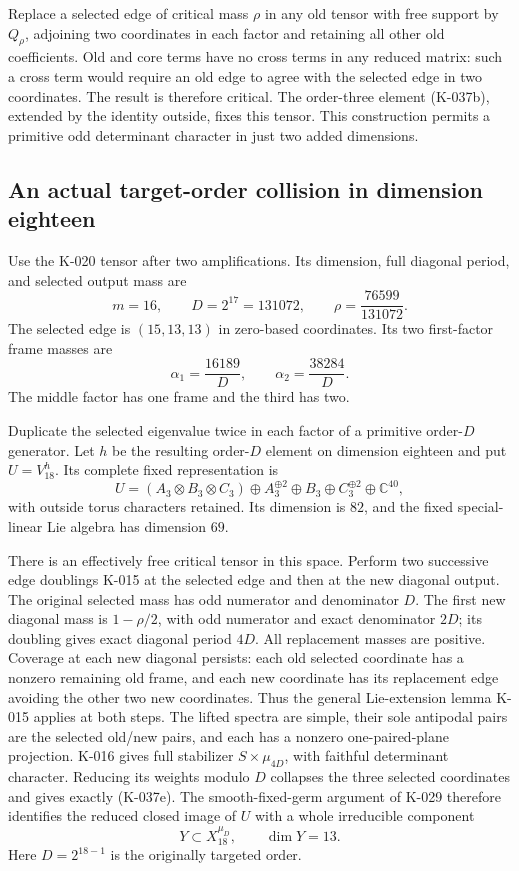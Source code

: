 Replace a selected edge of critical mass $\rho$ in any
old tensor with free support by $Q_\rho$, adjoining two coordinates in each
factor and retaining all other old coefficients. Old and
core terms have no cross terms in any reduced matrix:
such a cross term would require an old edge to agree with
the selected edge in two coordinates. The result is
therefore critical. The order-three element (K-037b),
extended by the identity outside, fixes this tensor.
This construction permits a primitive odd determinant
character in just two added dimensions.

\subsection*{An actual target-order collision in dimension eighteen}

Use the K-020 tensor after two amplifications. Its dimension,
full diagonal period, and selected output mass are
\[
 m=16,\qquad D=2^{17}=131072,\qquad
                 \rho=\frac{76599}{131072}.              \tag{K-037c}
\]
The selected edge is $(15,13,13)$ in zero-based coordinates.
Its two first-factor frame masses are
\[
             \alpha_1=\frac{16189}{D},\qquad
             \alpha_2=\frac{38284}{D}.                   \tag{K-037d}
\]
The middle factor has one frame and the third has two.

Duplicate the selected eigenvalue twice in each factor of
a primitive order-$D$ generator. Let $h$ be the resulting
order-$D$ element on dimension eighteen and put $U=V_{18}^h$.
Its complete fixed representation is
\[
 U=(A_3\otimes B_3\otimes C_3)\oplus A_3^{\oplus2}
          \oplus B_3\oplus C_3^{\oplus2}\oplus\mathbb C^{40},
                                                            \tag{K-037e}
\]
with outside torus characters retained. Its dimension is $82$,
and the fixed special-linear Lie algebra has dimension $69$.

There is an effectively free critical tensor in this space.
Perform two successive edge doublings K-015 at the selected
edge and then at the new diagonal output. The original
selected mass has odd numerator and denominator $D$.
The first new diagonal mass is $1-\rho/2$, with odd
numerator and exact denominator $2D$; its doubling gives
exact diagonal period $4D$. All replacement masses are
positive. Coverage at each new diagonal persists: each
old selected coordinate has a nonzero remaining old frame,
and each new coordinate has its replacement edge avoiding
the other two new coordinates. Thus the general Lie-extension
lemma K-015 applies at both steps. The lifted spectra are
simple, their sole antipodal pairs are the selected old/new
pairs, and each has a nonzero one-paired-plane projection.
K-016 gives full stabilizer $S\times\mu_{4D}$, with faithful
determinant character. Reducing its weights
modulo $D$ collapses the three selected coordinates and gives
exactly (K-037e). The smooth-fixed-germ argument of K-029
therefore identifies the reduced closed image of $U$ with
a whole irreducible component
\[
               Y\subset X_{18}^{\mu_D},\qquad\dim Y=13.
                                                            \tag{K-037f}
\]
Here $D=2^{18-1}$ is the originally targeted order.

